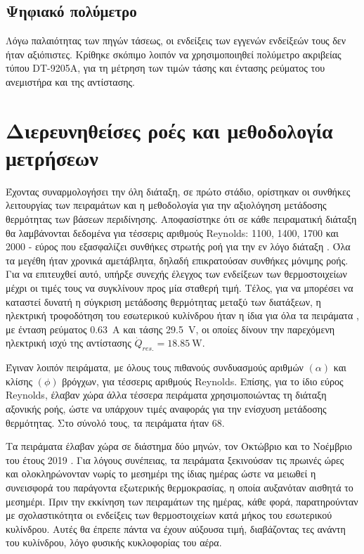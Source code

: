 \subsection{Ψηφιακό πολύμετρο}

\noindent Λόγω παλαιότητας των πηγών τάσεως, οι ενδείξεις των εγγενών ενδείξεών τους δεν ήταν αξιόπιστες. Κρίθηκε σκόπιμο λοιπόν να χρησιμοποιηθεί πολύμετρο ακριβείας τύπου DT-9205A, για τη μέτρηση των τιμών τάσης και έντασης ρεύματος του ανεμιστήρα και της αντίστασης.

\section{Διερευνηθείσες ροές και μεθοδολογία μετρήσεων}

\noindent Έχοντας συναρμολογήσει την όλη διάταξη, σε πρώτο στάδιο, ορίστηκαν οι συνθήκες λειτουργίας των πειραμάτων και η μεθοδολογία για την αξιολόγηση μετάδοσης θερμότητας των βάσεων περιδίνησης. Αποφασίστηκε ότι σε κάθε πειραματική διάταξη θα λαμβάνονται δεδομένα για τέσσερις αριθμούς Reynolds: 1100, 1400, 1700 και 2000 - εύρος που εξασφαλίζει συνθήκες στρωτής ροή για την εν λόγο διάταξη \cite{Dou2005}. Όλα τα μεγέθη ήταν χρονικά αμετάβλητα, δηλαδή επικρατούσαν συνθήκες μόνιμης ροής. Για να επιτευχθεί αυτό, υπήρξε συνεχής έλεγχος των ενδείξεων των θερμοστοιχείων μέχρι οι τιμές τους να συγκλίνουν προς μία σταθερή τιμή. Τέλος, για να μπορέσει να καταστεί δυνατή η σύγκριση μετάδοσης θερμότητας μεταξύ των διατάξεων, η ηλεκτρική τροφοδότηση του εσωτερικού κυλίνδρου ήταν η ίδια για όλα τα πειράματα \cite{1974_Bergles}, με ένταση ρεύματος \qty{0,63}{\ampere} και τάσης \qty{29.5}{\volt}, οι οποίες δίνουν την παρεχόμενη ηλεκτρική ισχύ της αντίστασης $\dot{Q}_{res.} = \qty{18.85}{\watt}$.

Έγιναν λοιπόν πειράματα, με όλους τους πιθανούς συνδυασμούς αριθμών $\left(\alpha\right)$ και κλίσης $\left(\phi\right)$ βρόγχων, για τέσσερις αριθμούς Reynolds. Επίσης, για το ίδιο εύρος Reynolds, έλαβαν χώρα άλλα τέσσερα πειράματα χρησιμοποιώντας τη διάταξη αξονικής ροής, ώστε να υπάρχουν τιμές αναφοράς για την ενίσχυση μετάδοσης θερμότητας. Στο σύνολό τους, τα πειράματα ήταν 68.

Τα πειράματα έλαβαν χώρα σε διάστημα δύο μηνών, τον Οκτώβριο και το Νοέμβριο του έτους 2019 . Για λόγους συνέπειας, τα πειράματα ξεκινούσαν τις πρωινές ώρες και ολοκληρώνονταν νωρίς το μεσημέρι της ίδιας ημέρας ώστε να μειωθεί η συνεισφορά του παράγοντα εξωτερικής θερμοκρασίας, η οποία αυξανόταν αισθητά το μεσημέρι. Πριν την εκκίνηση των πειραμάτων της ημέρας, κάθε φορά, παρατηρούνταν με σχολαστικότητα οι ενδείξεις των θερμοστοιχείων κατά μήκος του εσωτερικού κυλίνδρου. Αυτές θα έπρεπε πάντα να έχουν αύξουσα τιμή, διαβάζοντας τες ανάντη του κυλίνδρου, λόγο φυσικής κυκλοφορίας του αέρα.

